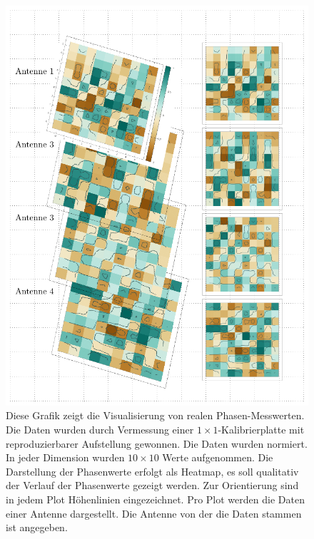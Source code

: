 \begin{figure}[ht!]
         \centering
         \includegraphics[width=1\textwidth]{img/complexitiy1.pdf}
         \caption[Normierte Messwerte von Kalibriermessung]{Diese Grafik zeigt die Visualisierung von realen Phasen-Messwerten. Die Daten wurden durch Vermessung einer $1\times1$-Kalibrierplatte mit reproduzierbarer Aufstellung gewonnen. Die Daten wurden normiert. In jeder Dimension wurden $10\times10$ Werte aufgenommen. Die Darstellung der Phasenwerte erfolgt als Heatmap, es soll qualitativ der Verlauf der Phasenwerte gezeigt werden. Zur Orientierung sind in jedem Plot Höhenlinien eingezeichnet. Pro Plot werden die Daten einer Antenne dargestellt. Die Antenne von der die Daten stammen ist angegeben.}
         \label{fig:Complexity1}
%
\end{figure}

